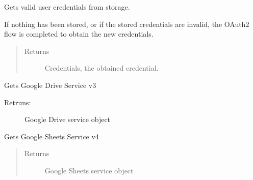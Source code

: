 \documentclass[letterpaper,10pt,english]{sphinxmanual}
\begin{document}
\begin{fulllineitems}
\begin{fulllineitems}
\label{rpicameramon:rpicameramon.telemetry.GoogleHandler.get_credentials}
Gets valid user credentials from storage.

If nothing has been stored, or if the stored credentials are invalid,
the OAuth2 flow is completed to obtain the new credentials.
\begin{quote}\begin{description}
\item[{Returns}] \leavevmode
Credentials, the obtained credential.

\end{description}\end{quote}

\end{fulllineitems}


\begin{fulllineitems}
\label{rpicameramon:rpicameramon.telemetry.GoogleHandler.get_file_service}
Gets Google Drive Service v3
\begin{description}
\item[{Retruns:}] \leavevmode
Google Drive service object

\end{description}

\end{fulllineitems}


\begin{fulllineitems}
\label{rpicameramon:rpicameramon.telemetry.GoogleHandler.get_sheets_service}
Gets Google Sheets Service v4
\begin{quote}\begin{description}
\item[{Returns}] \leavevmode
Google Sheets service object

\end{description}\end{quote}

\end{fulllineitems}



\end{fulllineitems}
\end{document}
